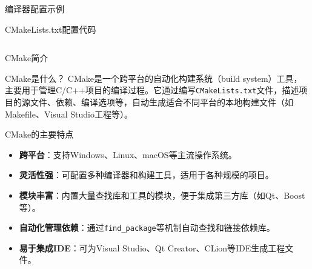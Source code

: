\documentclass[UTF8,aspectratio=169]{beamer}
\begin{document}
\begin{frame}[fragile]{编译器配置示例}
    \begin{ytublock}{CMakeLists.txt配置代码}
        \inputminted[fontsize=\tiny,breaklines=true,breakanywhere=true,linenos=true,frame=lines,framesep=3mm,rulecolor=\color{blue!20},bgcolor=blue!10]{cmake}{code/CMakeLists.txt}
    \end{ytublock}
\end{frame}

\begin{frame}{CMake简介}
    \begin{ytublock}{CMake是什么？}
        CMake是一个跨平台的自动化构建系统（build system）工具，主要用于管理C/C++项目的编译过程。它通过编写\texttt{CMakeLists.txt}文件，描述项目的源文件、依赖、编译选项等，自动生成适合不同平台的本地构建文件（如Makefile、Visual Studio工程等）。
    \end{ytublock}

    \begin{ytublock}{CMake的主要特点}
        \begin{itemize}
            \item \textbf{跨平台}：支持Windows、Linux、macOS等主流操作系统。
            \item \textbf{灵活性强}：可配置多种编译器和构建工具，适用于各种规模的项目。
            \item \textbf{模块丰富}：内置大量查找库和工具的模块，便于集成第三方库（如Qt、Boost等）。
            \item \textbf{自动化管理依赖}：通过\texttt{find\_package}等机制自动查找和链接依赖库。
            \item \textbf{易于集成IDE}：可为Visual Studio、Qt Creator、CLion等IDE生成工程文件。
        \end{itemize}
    \end{ytublock}
\end{frame}
\end{document}
